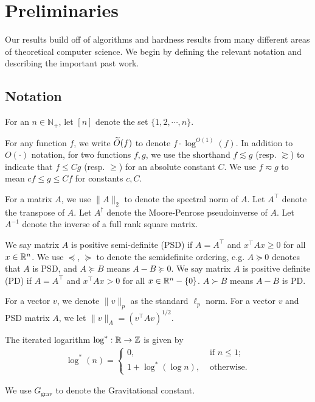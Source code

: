 \section{Preliminaries}\label{sec:preli}

Our results build off of algorithms and hardness results from many different areas of theoretical computer science. We begin by defining the relevant notation and describing the important past work.

\subsection{Notation}

For an $n\in \mathbb{N}_{+}$, let $[n]$ denote the set $\{1,2,\cdots,n\}$.

For any function $f$, we write $\widetilde{O}(f)$ to denote $f\cdot \log^{O(1)}(f)$. In addition to $O(\cdot)$ notation, for two functions $f,g$, we use the shorthand $f\lesssim g$ (resp. $\gtrsim$) to indicate that $f\leq C g$ (resp. $\geq$) for an absolute constant $C$. We use $f\eqsim g$ to mean $cf\leq g\leq Cf$ for constants $c,C$.

For a matrix $A$, we use $\|A\|_2$ to denote the spectral norm of $A$. Let $A^\top$ denote the transpose of $A$. Let $A^\dagger$ denote the Moore-Penrose pseudoinverse of $A$. Let $A^{-1}$ denote the inverse of a full rank square matrix. 

We say matrix $A$ is positive semi-definite (PSD) if $A = A^\top$ and $x^\top A x \geq 0$ for all $x \in {\mathbb R}^n$. We use $\preceq$, $\succeq$ to denote the semidefinite ordering, e.g. $A \succeq 0$ denotes that $A$ is PSD, and $A \succeq B $ means $A- B \succeq 0$. We say matrix $A$ is positive definite (PD) if $A = A^\top$ and $x^\top A x > 0$ for all $x \in {\mathbb R}^n -\{0\}$. $A \succ B$ means $A-B$ is PD.

For a vector $v$, we denote $\| v \|_p$ as the standard $\ell_p$ norm. For a vector $v$ and PSD matrix $A$, we let $\| v \|_A = (v^\top A v)^{1/2}$.

The iterated logarithm $\log^* : {\mathbb R} \to {\mathbb Z}$ is given by \begin{align*}
    \log^*(n) = \begin{cases}
    0, &\text{ if } n \leq 1 ; \\
    1 + \log^*(\log n), &\text{ otherwise.}
    \end{cases}
\end{align*}

We use $G_{\text{grav}}$ to denote the Gravitational constant.

